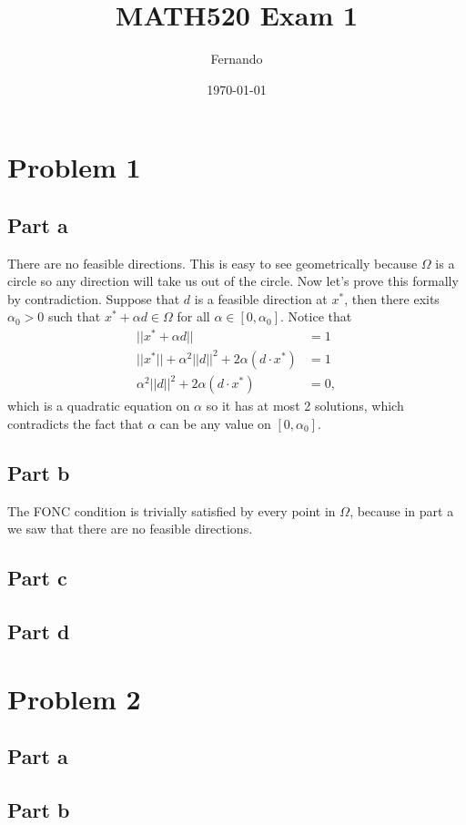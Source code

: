 \documentclass{article}
\begin{document}
\title{MATH520 Exam 1}
\author{Fernando}
\date{\today}
\maketitle

\section*{Problem 1}
\subsection*{Part a}
There are no feasible directions. This is easy to see geometrically because
$\Omega$ is a circle so any direction will take us out of the circle. Now let's
prove this formally by contradiction. Suppose that $d$ is a feasible direction
at $x^*$, then there exits $\alpha_0>0$ such that $x^*+\alpha d\in\Omega$ for
all $\alpha \in [0,\alpha_0]$. Notice that
\begin{align*}
||x^*+\alpha d||&=1\\
||x^*||+\alpha^2||d||^2+2\alpha (d\cdot x^*)&=1\\
\alpha^2||d||^2+2\alpha (d\cdot x^*)&=0,
\end{align*}
which is a quadratic equation on $\alpha$ so it has at most 2 solutions, which
contradicts the fact that $\alpha$ can be any value on $[0,\alpha_0]$.
\subsection*{Part b}
The FONC condition is trivially satisfied by every point in $\Omega$, because
in part a we saw that there are no feasible directions.
\subsection*{Part c}
\subsection*{Part d}
\section*{Problem 2}
\subsection*{Part a}
\subsection*{Part b}
\end{document}
